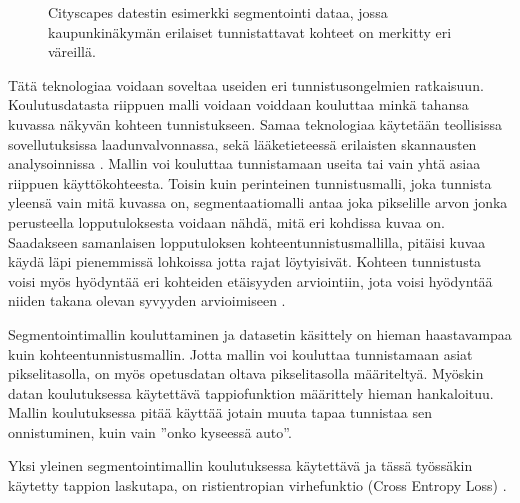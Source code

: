 \begin{figure}[h]
\centering
{}
\caption[Tämä on lyhyt kuvateksti.]{Cityscapes datestin esimerkki segmentointi dataa, jossa kaupunkinäkymän erilaiset tunnistattavat kohteet on merkitty eri väreillä.}
\label{fig:labels}
\end{figure}

Tätä teknologiaa voidaan soveltaa useiden eri tunnistusongelmien ratkaisuun.
Koulutusdatasta riippuen malli voidaan voiddaan kouluttaa minkä tahansa kuvassa näkyvän kohteen tunnistukseen.
Samaa teknologiaa käytetään teollisissa sovellutuksissa laadunvalvonnassa,
sekä lääketieteessä erilaisten skannausten analysoinnissa \cite{NagalakshmiT2022BCSS}.
Mallin voi kouluttaa tunnistamaan useita tai vain yhtä asiaa riippuen käyttökohteesta.
Toisin kuin perinteinen tunnistusmalli, joka tunnista yleensä vain mitä kuvassa on,
segmentaatiomalli antaa joka pikselille arvon jonka perusteella lopputuloksesta voidaan nähdä, mitä eri kohdissa kuvaa on.
Saadakseen samanlaisen lopputuloksen kohteentunnistusmallilla, pitäisi kuvaa käydä läpi pienemmissä lohkoissa jotta rajat löytyisivät.
Kohteen tunnistusta voisi myös hyödyntää eri kohteiden etäisyyden arviointiin, jota voisi hyödyntää niiden takana olevan syvyyden arvioimiseen \cite{ShiZhou2023VRBo}.

Segmentointimallin kouluttaminen ja datasetin käsittely on hieman haastavampaa kuin kohteentunnistusmallin.
Jotta mallin voi kouluttaa tunnistamaan asiat pikselitasolla, on myös opetusdatan oltava pikselitasolla määriteltyä. 
Myöskin datan koulutuksessa käytettävä tappiofunktion määrittely hieman hankaloituu.
Mallin koulutuksessa pitää käyttää jotain muuta tapaa tunnistaa sen onnistuminen, kuin vain ”onko kyseessä auto”.

Yksi yleinen segmentointimallin koulutuksessa käytettävä ja tässä työssäkin käytetty tappion laskutapa, 
on ristientropian virhefunktio (Cross Entropy Loss) \cite{CrossEntropyLoss}. 

